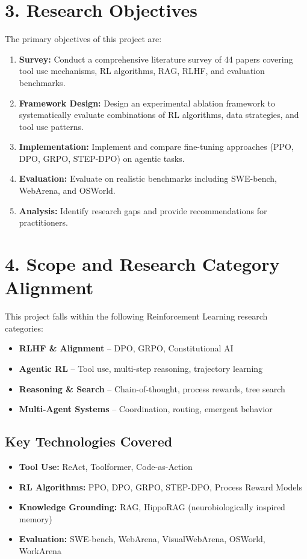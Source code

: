 \documentclass[12pt,a4paper]{report}
\theoremstyle{definition}
\begin{document}
\section*{3. Research Objectives}

The primary objectives of this project are:
\begin{enumerate}
    \item \textbf{Survey:} Conduct a comprehensive literature survey of 44 papers covering tool use mechanisms, RL algorithms, RAG, RLHF, and evaluation benchmarks.
    \item \textbf{Framework Design:} Design an experimental ablation framework to systematically evaluate combinations of RL algorithms, data strategies, and tool use patterns.
    \item \textbf{Implementation:} Implement and compare fine-tuning approaches (PPO, DPO, GRPO, STEP-DPO) on agentic tasks.
    \item \textbf{Evaluation:} Evaluate on realistic benchmarks including SWE-bench, WebArena, and OSWorld.
    \item \textbf{Analysis:} Identify research gaps and provide recommendations for practitioners.
\end{enumerate}

\section*{4. Scope and Research Category Alignment}

This project falls within the following Reinforcement Learning research categories:
\begin{itemize}
    \item \textbf{RLHF \& Alignment} -- DPO, GRPO, Constitutional AI
    \item \textbf{Agentic RL} -- Tool use, multi-step reasoning, trajectory learning
    \item \textbf{Reasoning \& Search} -- Chain-of-thought, process rewards, tree search
    \item \textbf{Multi-Agent Systems} -- Coordination, routing, emergent behavior
\end{itemize}

\subsection*{Key Technologies Covered}
\begin{itemize}
    \item \textbf{Tool Use:} ReAct, Toolformer, Code-as-Action
    \item \textbf{RL Algorithms:} PPO, DPO, GRPO, STEP-DPO, Process Reward Models
    \item \textbf{Knowledge Grounding:} RAG, HippoRAG (neurobiologically inspired memory)
    \item \textbf{Evaluation:} SWE-bench, WebArena, VisualWebArena, OSWorld, WorkArena
\end{itemize}
\end{document}

